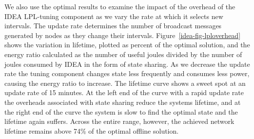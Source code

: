 We also use the optimal results to examine the impact of the overhead of the
IDEA LPL-tuning component as we vary the rate at which it selects new
intervals. The update rate determines the number of broadcast messages
generated by nodes as they change their intervals.
Figure~\ref{idea-fig-lploverhead} shows the variation in lifetime, plotted as
percent of the optimal solution, and the energy ratio calculated as the
number of useful joules divided by the number of joules consumed by IDEA in
the form of state sharing. As we decrease the update rate the tuning
component changes state less frequently and consumes less power, causing the
energy ratio to increase. The lifetime curve shows a sweet spot at an update
rate of 15 minutes. At the left end of the curve with a rapid update rate the
overheads associated with state sharing reduce the systems lifetime, and at
the right end of the curve the system is slow to find the optimal state and
the lifetime again suffers. Across the entire range, however, the achieved
network lifetime remains above 74\% of the optimal offline solution.




